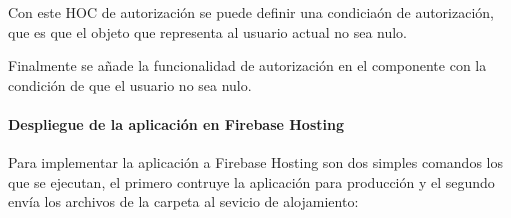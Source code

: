 Con este HOC de autorización se puede definir una condiciaón de autorización, que es que el objeto que representa al usuario actual
no sea nulo.

Finalmente se añade la funcionalidad de autorización en el componente 
con la condición de que el usuario no sea nulo.

%
\begin{sphinxVerbatim}[commandchars=\\\{\}]
     
  
\end{sphinxVerbatim}


\paragraph{Despliegue de la aplicación en Firebase Hosting}
\label{\detokenize{code_docs:despliegue-de-la-aplicacion-en-firebase-hosting}}
Para implementar la aplicación a Firebase Hosting son dos simples comandos los
que se ejecutan, el primero contruye la aplicación para producción y
el segundo envía los archivos de la carpeta  al sevicio de alojamiento:

%
\begin{sphinxVerbatim}[commandchars=\\\{\}]
  
 
\end{sphinxVerbatim}

